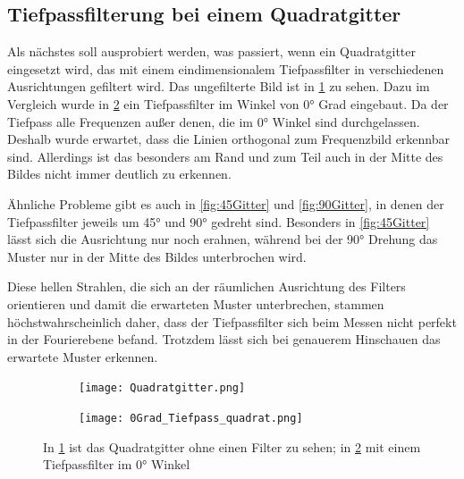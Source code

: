 \subsection{Tiefpassfilterung bei einem Quadratgitter}
Als nächstes soll ausprobiert werden, was passiert, wenn ein Quadratgitter eingesetzt wird, das mit einem eindimensionalem Tiefpassfilter in verschiedenen Ausrichtungen gefiltert wird. Das ungefilterte Bild ist in \cref{fig:Gitter} zu sehen. Dazu im Vergleich wurde in \cref{fig:0Gitter} ein Tiefpassfilter im Winkel von 0° Grad eingebaut. Da der Tiefpass alle Frequenzen außer denen, die im 0° Winkel sind durchgelassen. Deshalb wurde erwartet, dass die Linien orthogonal zum Frequenzbild erkennbar sind. Allerdings ist das besonders am Rand und zum Teil auch in der Mitte des Bildes nicht immer deutlich zu erkennen. 

Ähnliche Probleme gibt es auch in \cref{fig:45Gitter} und \cref{fig:90Gitter}, in denen der Tiefpassfilter jeweils um 45° und 90° gedreht sind. Besonders in \cref{fig:45Gitter} lässt sich die Ausrichtung nur noch erahnen, während bei der 90° Drehung das Muster nur in der Mitte des Bildes unterbrochen wird.

Diese hellen Strahlen, die sich an der räumlichen Ausrichtung des Filters orientieren und damit die erwarteten Muster unterbrechen, stammen höchstwahrscheinlich daher, dass der Tiefpassfilter sich beim Messen nicht perfekt in der Fourierebene befand. Trotzdem lässt sich bei genauerem Hinschauen das erwartete Muster erkennen.





\begin{figure}[h]
	\begin{subfigure}[c]{0.5\textwidth}
		
		\texttt{[image: Quadratgitter.png]}
		\caption{}
		\label{fig:Gitter}
		
	\end{subfigure}
	\begin{subfigure}[c]{0.5\textwidth}
		\texttt{[image: 0Grad\_Tiefpass\_quadrat.png]}
		\caption{}
		\label{fig:0Gitter}
	\end{subfigure}
	\caption{In \cref{fig:Gitter} ist das Quadratgitter ohne einen Filter zu sehen; in \cref{fig:0Gitter} mit einem Tiefpassfilter im 0° Winkel}
	\label{Gitter1}
\end{figure}  




